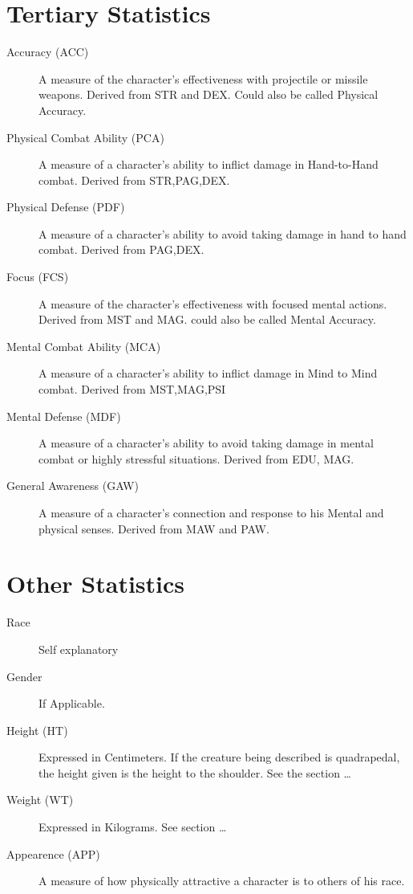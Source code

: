 \section{Tertiary Statistics}
\begin{description}
	\item[Accuracy (ACC)]
    A measure of the character's effectiveness with projectile or missile
    weapons. Derived from STR and DEX. Could also be called Physical
    Accuracy.
	\item[Physical Combat Ability (PCA)]
    A measure of a character's ability to in\-flict 
	dam\-age in Hand-to-Hand combat. Derived from STR,PAG,DEX.
	\item[Physical Defense (PDF)]
    A measure of a character's ability to avoid taking damage in hand to
    hand combat. Derived from PAG,DEX.
	\item[Focus	(FCS)]
    A measure of the character's effectiveness with focused mental
    actions. Derived from MST and MAG. could also be called Mental
    Accuracy.
	\item[Mental Combat Ability (MCA)]
    A measure of a character's ability to inflict damage in Mind to Mind
    combat. Derived from MST,MAG,PSI
	\item[Mental Defense (MDF)]
    A measure of a character's ability to avoid taking damage in mental
    combat or highly stressful situations. Derived from EDU, MAG.
	\item[General Awareness (GAW)]
    A measure of a character's connection and response to his Mental and
    physical senses. Derived from MAW and PAW.
\end{description}

\section{Other Statistics}
\begin{description}
	\item[Race]
    Self explanatory
	\item[Gender]
    If Applicable.
	\item[Height  (HT) ]
    Expressed in Centimeters. If the creature being described is
    quadrapedal, the height given is the height to the shoulder.
    See the section \dots
	\item[Weight  (WT) ]
    Expressed in Kilograms. See section \dots
	\item[Appearence   (APP)]
    A measure of how physically attractive a character is 
	to others of his race.
\end{description}

